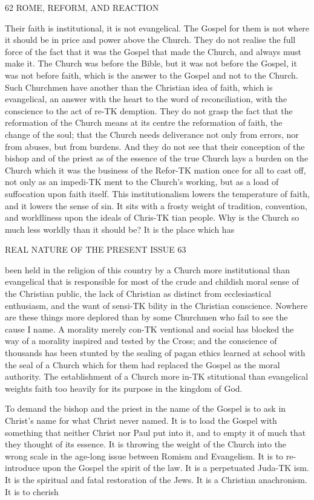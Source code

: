 \documentclass[12pt,a5paper,oneside]{book}
\begin{document}
62 ROME, REFORM, AND REACTION 

Their faith is institutional, it is not evangelical. The 
Gospel for them is not where it should be in price 
and power above the Church. They do not realise 
the full force of the fact that it was the Gospel that 
made the Church, and always must make it. The 
Church was before the Bible, but it was not before the 
Gospel, it was not before faith, which is the answer to 
the Gospel and not to the Church. Such Churchmen 
have another than the Christian idea of faith, which is 
evangelical, an answer with the heart to the word of 
reconciliation, with the conscience to the act of re-TK
demption. They do not grasp the fact that the 
reformation of the Church means at its centre the 
reformation of faith, the change of the soul; that the 
Church needs deliverance not only from errors, nor 
from abuses, but from burdens. And they do not see 
that their conception of the bishop and of the priest 
as of the essence of the true Church lays a burden on 
the Church which it was the business of the Refor-TK
mation once for all to cast off, not only as an impedi-TK
ment to the Church's working, but as a load of 
suffocation upon faith itself. This institutionalism 
lowers the temperature of faith, and it lowers the 
sense of sin. It sits with a frosty weight of tradition, 
convention, and worldliness upon the ideals of Chris-TK
tian people. Why is the Church so much less 
worldly than it should be? It is the place which has 



REAL NATURE OF THE PRESENT ISSUE 63 

been held in the religion of this country by a Church 
more institutional than evangelical that is responsible 
for most of the crude and childish moral sense of the 
Christian public, the lack of Christian as distinct 
from ecclesiastical enthusiasm, and the want of sensi-TK
bility in the Christian conscience. Nowhere are these 
things more deplored than by some Churchmen who 
fail to see the cause I name. A morality merely con-TK
ventional and social has blocked the way of a morality 
inspired and tested by the Cross; and the conscience 
of thousands has been stunted by the sealing of pagan 
ethics learned at school with the seal of a Church 
which for them had replaced the Gospel as the moral 
authority. The establishment of a Church more in-TK
stitutional than evangelical weights faith too heavily 
for its purpose in the kingdom of God. 

To demand the bishop and the priest in the name 
of the Gospel is to ask in Christ's name for what 
Christ never named. It is to load the Gospel with 
something that neither Christ nor Paul put into it, 
and to empty it of much that they thought of its 
essence. It is throwing the weight of the Church into 
the wrong scale in the age-long issue between Romism 
and Evangelism. It is to re-introduce upon the 
Gospel the spirit of the law. It is a perpetuated Juda-TK
ism. It is the spiritual and fatal restoration of the 
Jews. It is a Christian anachronism. It is to cherish 
\end{document}
